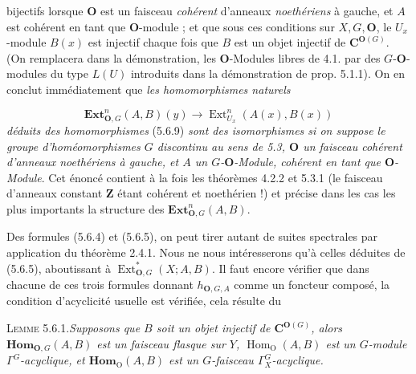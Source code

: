 \clearpage
{}

\noindent bijectifs lorsque ${\mathbf O}$ est un faisceau \textit{cohérent} d'anneaux
\textit{noethériens} à gauche, et $A$ est cohérent en tant que ${\mathbf O}$-module ; et
que sous ces conditions sur $X,G,{\mathbf O}$, le $U_x$-module $B(x)$ est injectif chaque
fois que $B$ est un objet injectif de ${\mathbf C}^{{\mathbf O}(G)}$. (On remplacera dans la
démonstration, les ${\mathbf O}$-Modules libres de 4.1. par des $G$-${\mathbf O}$-modules du type
$L(U)$ introduits dans la démonstration de prop. 5.1.1). On en conclut
immédiatement que \textit{les homomorphismes naturels}

\[
\tag{5.6.10}
\mathbf{Ext}_{{\mathbf O},G}^n(A,B)(y)
\to \operatorname{Ext}_{U_x}^n(A(x),B(x))
\]
\textit{déduits des homomorphismes} (5.6.9) \textit{sont des
isomorphismes si on suppose le groupe d'homéomorphismes $G$ discontinu au sens
de \textup{5.3}, ${\mathbf O}$ un faisceau cohérent d'anneaux noethériens à gauche, et $A$ un
$G$-${\mathbf O}$-Module, cohérent en tant que ${\mathbf O}$-Module}. Cet énoncé contient à la fois
les théorèmes 4.2.2 et 5.3.1 (le faisceau d'anneaux constant $\mathbf Z$ étant
cohérent et noethérien !) et précise dans les cas les plus importants la
structure des $\mathbf{Ext}_{{\mathbf O},G}^n(A,B)$.

Des formules (5.6.4) et (5.6.5), on peut tirer autant de suites spectrales par
application du théorème 2.4.1. Nous ne nous intéresserons qu'à celles déduites
de (5.6.5), aboutissant à $\operatorname{Ext}_{{\mathbf O},G}^{*}(X;A,B)$. Il faut encore
vérifier que dans chacune de ces trois formules donnant $h_{{\mathbf O},G,A}$ comme un
foncteur composé, la condition d'acyclicité usuelle est vérifiée, cela résulte
du

\textsc{Lemme 5.6.1.}\quad \textit{Supposons que $B$ soit un objet
injectif de ${\mathbf C}^{{\mathbf O}(G)}$, alors $\mathbf{Hom}_{{\mathbf O},G}(A,B)$ est un faisceau flasque
sur $Y$, $\operatorname{Hom}_{\mathrm O}(A,B)$ est un $G$-module
$\Gamma^G$-acyclique, et $\mathbf{Hom}_{\mathrm O}(A,B)$ est un $G$-faisceau
$\Gamma_X^G$-acyclique.}

